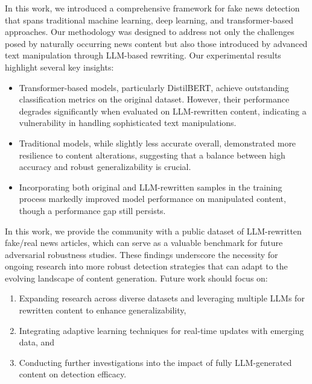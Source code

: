 \documentclass[runningheads]{llncs}
\begin{document}
In this work, we introduced a comprehensive framework for fake news detection that spans traditional machine learning, deep learning, and transformer-based approaches. Our methodology was designed to address not only the challenges posed by naturally occurring news content but also those introduced by advanced text manipulation through LLM-based rewriting. Our experimental results highlight several key insights:
\begin{itemize}
\item Transformer-based models, particularly DistilBERT, achieve outstanding classification metrics on the original dataset. However, their performance degrades significantly when evaluated on LLM-rewritten content, indicating a vulnerability in handling sophisticated text manipulations.
\item Traditional models, while slightly less accurate overall, demonstrated more resilience to content alterations, suggesting that a balance between high accuracy and robust generalizability is crucial.
\item Incorporating both original and LLM-rewritten samples in the training process markedly improved model performance on manipulated content, though a performance gap still persists.
\end{itemize}

In this work, we provide the community with a public dataset of LLM-rewritten fake/real news articles, which can serve as a valuable benchmark for future adversarial robustness studies. These findings underscore the necessity for ongoing research into more robust detection strategies that can adapt to the evolving landscape of content generation. Future work should focus on:
\begin{enumerate}
\item Expanding research across diverse datasets and leveraging multiple LLMs for rewritten content to enhance generalizability,
\item Integrating adaptive learning techniques for real-time updates with emerging data, and
\item Conducting further investigations into the impact of fully LLM-generated content on detection efficacy.
\end{enumerate}
\end{document}
